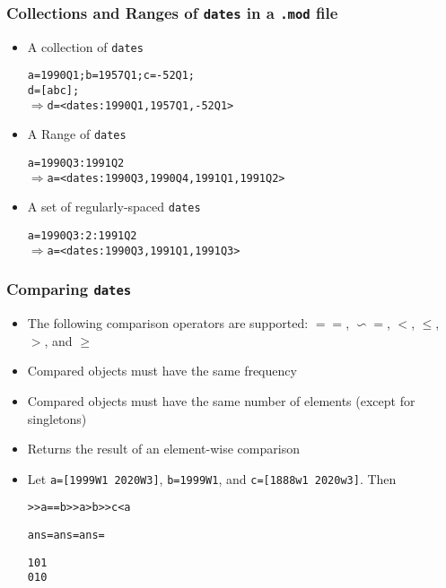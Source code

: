 \documentclass[10pt]{beamer}
\newcommand{\myitem}{\item[$\bullet$]}
\begin{document}
\begin{frame}[fragile,t]
  \frametitle{Collections and Ranges of \texttt{dates} in a \texttt{.mod} file}
  \begin{itemize}
    \myitem A collection of \texttt{dates}
    \begin{alltt}
  a = 1990Q1; b = 1957Q1; c = -52Q1;
  d = [a b c];
  \(\Rightarrow\) d = <dates: 1990Q1, 1957Q1, -52Q1>
    \end{alltt}
    \myitem A Range of \texttt{dates}
    \begin{alltt}
  a = 1990Q3:1991Q2
  \(\Rightarrow\) a = <dates: 1990Q3, 1990Q4, 1991Q1, 1991Q2>
    \end{alltt}
    \myitem A set of regularly-spaced \texttt{dates}
    \begin{alltt}
  a = 1990Q3:2:1991Q2
  \(\Rightarrow\) a = <dates: 1990Q3, 1991Q1, 1991Q3>
    \end{alltt}
  \end{itemize}
\end{frame}


\begin{frame}[fragile,t]
  \frametitle{Comparing \texttt{dates}}
  \begin{itemize}
    \myitem The following comparison operators are supported: $==$, $\backsim=$, $<$, $\leq$, $>$, and $\geq$
    \myitem Compared objects must have the same frequency
    \myitem Compared objects must have the same number of elements (except for singletons)
    \myitem Returns the result of an element-wise comparison
    \myitem Let \texttt{a=[1999W1 2020W3]}, \texttt{b=1999W1}, and \texttt{c=[1888w1 2020w3]}. Then
    \begin{alltt}
  >> a == b              >> a > b              >> c < a

  ans =                  ans =                 ans =

       1                      0                     1
       0                      1                     0
    \end{alltt}
  \end{itemize}
\end{frame}
\end{document}
